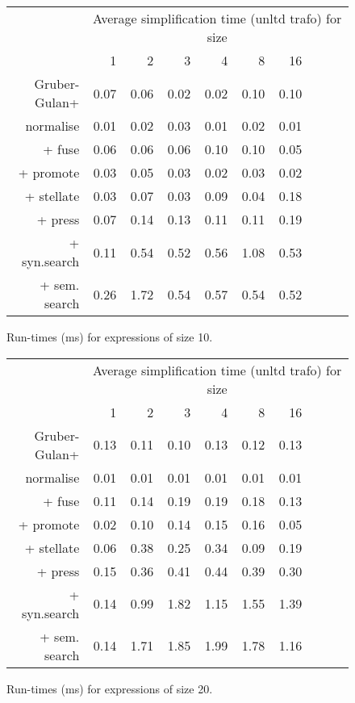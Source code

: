 \begin{figure}\begin{tabular}{rrrrrrrrrr}
 & \multicolumn{9}{c}{Average simplification time (unltd trafo) for size} \\
 & 1 & 2 & 3 & 4 & 8 & 16 \\
Gruber-Gulan+ & 0.07 & 0.06 & 0.02 & 0.02 & 0.10 & 0.10 \\
normalise & 0.01 & 0.02 & 0.03 & 0.01 & 0.02 & 0.01 \\
+ fuse & 0.06 & 0.06 & 0.06 & 0.10 & 0.10 & 0.05 \\
+ promote & 0.03 & 0.05 & 0.03 & 0.02 & 0.03 & 0.02 \\
+ stellate & 0.03 & 0.07 & 0.03 & 0.09 & 0.04 & 0.18 \\
+ press & 0.07 & 0.14 & 0.13 & 0.11 & 0.11 & 0.19 \\
+ syn.search & 0.11 & 0.54 & 0.52 & 0.56 & 1.08 & 0.53 \\
+ sem. search & 0.26 & 1.72 & 0.54 & 0.57 & 0.54 & 0.52 \\
\end{tabular}\caption{Run-times (ms) for expressions of size 10.}\end{figure}
\begin{figure}\begin{tabular}{rrrrrrrrrr}
 & \multicolumn{9}{c}{Average simplification time (unltd trafo) for size} \\
 & 1 & 2 & 3 & 4 & 8 & 16 \\
Gruber-Gulan+ & 0.13 & 0.11 & 0.10 & 0.13 & 0.12 & 0.13 \\
normalise & 0.01 & 0.01 & 0.01 & 0.01 & 0.01 & 0.01 \\
+ fuse & 0.11 & 0.14 & 0.19 & 0.19 & 0.18 & 0.13 \\
+ promote & 0.02 & 0.10 & 0.14 & 0.15 & 0.16 & 0.05 \\
+ stellate & 0.06 & 0.38 & 0.25 & 0.34 & 0.09 & 0.19 \\
+ press & 0.15 & 0.36 & 0.41 & 0.44 & 0.39 & 0.30 \\
+ syn.search & 0.14 & 0.99 & 1.82 & 1.15 & 1.55 & 1.39 \\
+ sem. search & 0.14 & 1.71 & 1.85 & 1.99 & 1.78 & 1.16 \\
\end{tabular}\caption{Run-times (ms) for expressions of size 20.}\end{figure}

